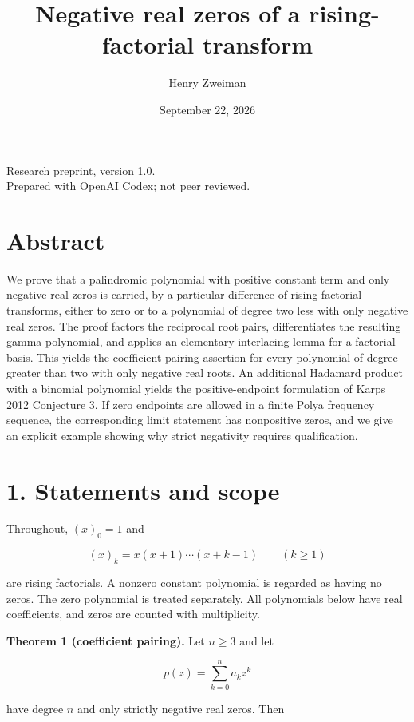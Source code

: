 \documentclass[11pt]{article}
\title{Negative real zeros of a rising-factorial transform}
\author{Henry Zweiman}
\date{September 22, 2026}
\begin{document}
\maketitle
\begin{center}\small Research preprint, version 1.0.\\
Prepared with OpenAI Codex; not peer reviewed.\end{center}
\section{Abstract}\label{abstract}

We prove that a palindromic polynomial with positive constant term and
only negative real zeros is carried, by a particular difference of
rising-factorial transforms, either to zero or to a polynomial of degree
two less with only negative real zeros. The proof factors the reciprocal
root pairs, differentiates the resulting gamma polynomial, and applies
an elementary interlacing lemma for a factorial basis. This yields the
coefficient-pairing assertion for every polynomial of degree greater
than two with only negative real roots. An additional Hadamard product
with a binomial polynomial yields the positive-endpoint formulation of
Karp\textquotesingle s 2012 Conjecture 3. If zero endpoints are allowed
in a finite Polya frequency sequence, the corresponding limit statement
has nonpositive zeros, and we give an explicit example showing why
strict negativity requires qualification.

\section{1. Statements and scope}\label{statements-and-scope}

Throughout, \((x)_0=1\) and

\[
(x)_k=x(x+1)\cdots(x+k-1)\qquad(k\ge1)
\]

are rising factorials. A nonzero constant polynomial is regarded as
having no zeros. The zero polynomial is treated separately. All
polynomials below have real coefficients, and zeros are counted with
multiplicity.

\textbf{Theorem 1 (coefficient pairing).} Let \(n\ge3\) and let

\[
p(z)=\sum_{k=0}^n a_kz^k
\]

have degree \(n\) and only strictly negative real zeros. Then
\end{document}
